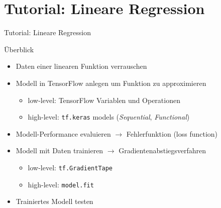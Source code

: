 \documentclass[utf8, smaller, c]{beamer}
\renewcommand{\tt}[1]{{\texttt{#1}}}
\begin{document}
\section{Tutorial: Lineare Regression}
\begin{frame}{Tutorial: Lineare Regression}
    \begin{block}{Überblick}
        \begin{itemize}
            \item Daten einer linearen Funktion verrauschen
            \item Modell in TensorFlow anlegen um Funktion zu approximieren
            \begin{itemize}
                \item low-level: TensorFlow Variablen und Operationen
                \item high-level: \tt{tf.keras} models (\textit{Sequential}, \textit{Functional})
            \end{itemize}
            \item Modell-Performance evaluieren $\rightarrow$ Fehlerfunktion (loss function)
            \item Modell mit Daten trainieren $\rightarrow$ Gradientenabstiegsverfahren
            \begin{itemize}
                \item low-level: \tt{tf.GradientTape}
                \item high-level: \tt{model.fit}
            \end{itemize}
            \item Trainiertes Modell testen
        \end{itemize}
    \end{block}
    
    \framebreak
    

\end{frame}
\end{document}
